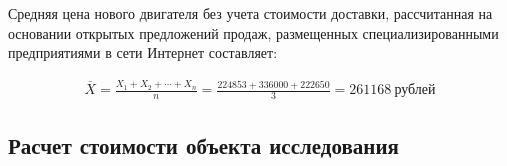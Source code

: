 Средняя цена нового двигателя без учета стоимости доставки, рассчитанная на основании открытых предложений продаж, размещенных специализированными предприятиями в сети Интернет составляет:

\begin{multline}
\label{AMean} 
\overline{X} = \frac{X_1 + X_2 + \cdots +X_n }{n} = \frac{224853 + 336000 + 222650}{3} = 261168 \ \text{рублей}
\end{multline}


\subsection{Расчет стоимости объекта исследования}
%
%
%
%
%
%
%
%
%
%
% 
%
% 
% 
% 
% 
% 
%
%
